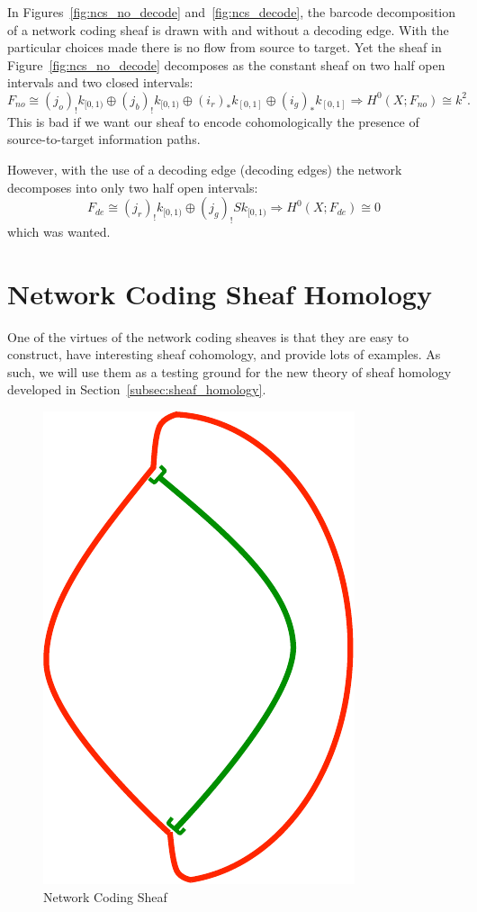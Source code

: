 \begin{ex}
In Figures~\ref{fig:ncs_no_decode} and~\ref{fig:ncs_decode}, the barcode decomposition of a network coding sheaf is drawn with and without a decoding edge.
With the particular choices made there is no flow from source to target. Yet the sheaf in Figure~\ref{fig:ncs_no_decode} decomposes as the constant sheaf on two half open intervals and two closed intervals:
\[
F_{no}\cong (j_o)_! k_{[0,1)}\oplus(j_b)_! k_{[0,1)}\oplus (i_r)_* k_{[0,1]}\oplus (i_g)_*k_{[0,1]} \Rightarrow H^0(X;F_{no})\cong k^2.
\]
This is bad if we want our sheaf to encode cohomologically the presence of source-to-target information paths.

However, with the use of a decoding edge (decoding edges) the network decomposes into only two half open intervals:
\[
F_{de}\cong (j_r)_!k_{[0,1)}\oplus(j_g)_!S k_{[0,1)} \Rightarrow H^0(X;F_{de})\cong 0
\]
which was wanted.
\end{ex}

\section{Network Coding Sheaf Homology}
\label{subsubsec:sheaf_homology_graphs}
One of the virtues of the network coding sheaves is that they are easy to construct, have interesting sheaf cohomology, and provide lots of examples. As such, we will use them as a testing ground for the new theory of sheaf homology developed in Section~\ref{subsec:sheaf_homology}.

\begin{figure}[ht]
\centering
\includegraphics[width=.5\textwidth]{nc_1.pdf}
\caption{Network Coding Sheaf}
\label{fig:nc_1}
\end{figure}

